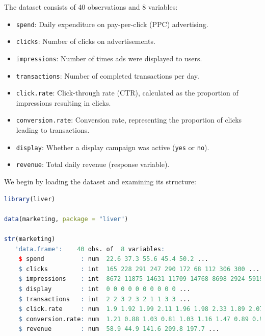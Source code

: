 \documentclass[
  11pt,
]{book}
\newcommand{\passthrough}[1]{#1}
\providecommand{\tightlist}{%
  \setlength{\itemsep}{0pt}\setlength{\parskip}{0pt}}
\theoremstyle{definition}
\theoremstyle{definition}
\theoremstyle{definition}
\theoremstyle{definition}
\theoremstyle{remark}
\begin{document}
The dataset consists of 40 observations and 8 variables:

\begin{itemize}
\tightlist
\item
  \passthrough{\lstinline!spend!}: Daily expenditure on pay-per-click (PPC) advertising.\\
\item
  \passthrough{\lstinline!clicks!}: Number of clicks on advertisements.\\
\item
  \passthrough{\lstinline!impressions!}: Number of times ads were displayed to users.\\
\item
  \passthrough{\lstinline!transactions!}: Number of completed transactions per day.\\
\item
  \passthrough{\lstinline!click.rate!}: Click-through rate (CTR), calculated as the proportion of impressions resulting in clicks.\\
\item
  \passthrough{\lstinline!conversion.rate!}: Conversion rate, representing the proportion of clicks leading to transactions.\\
\item
  \passthrough{\lstinline!display!}: Whether a display campaign was active (\passthrough{\lstinline!yes!} or \passthrough{\lstinline!no!}).\\
\item
  \passthrough{\lstinline!revenue!}: Total daily revenue (response variable).
\end{itemize}

We begin by loading the dataset and examining its structure:

\begin{lstlisting}[language=R]
library(liver)

data(marketing, package = "liver")

str(marketing)
   'data.frame':    40 obs. of  8 variables:
    $ spend          : num  22.6 37.3 55.6 45.4 50.2 ...
    $ clicks         : int  165 228 291 247 290 172 68 112 306 300 ...
    $ impressions    : int  8672 11875 14631 11709 14768 8698 2924 5919 14789 14818 ...
    $ display        : int  0 0 0 0 0 0 0 0 0 0 ...
    $ transactions   : int  2 2 3 2 3 2 1 1 3 3 ...
    $ click.rate     : num  1.9 1.92 1.99 2.11 1.96 1.98 2.33 1.89 2.07 2.02 ...
    $ conversion.rate: num  1.21 0.88 1.03 0.81 1.03 1.16 1.47 0.89 0.98 1 ...
    $ revenue        : num  58.9 44.9 141.6 209.8 197.7 ...
\end{lstlisting}
\end{document}
